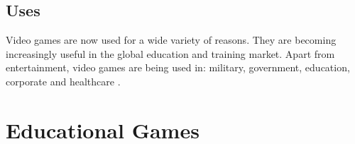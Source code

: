 \documentclass[a4paper,11.5pt]{report}
\numberwithin{figure}{section}
\numberwithin{table}{section}
\numberwithin{equation}{section}
\numberwithin{equation}{section}
\begin{document}
\subsection{Uses}

Video games are now used for a wide variety of reasons. They are becoming increasingly useful in the global education and training market. Apart from entertainment, video games are being used in: military, government, education, corporate and healthcare \citep{Johann2015}.







\section{Educational Games}
\end{document}
